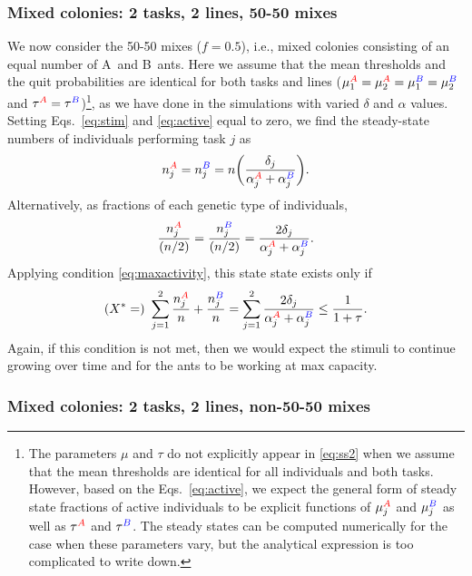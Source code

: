 \documentclass[11pt]{article}
\newcommand{\A}{{\color{red}A}}
\newcommand{\B}{{\color{blue}B}}
\begin{document}
\begin{appendices}
\subsubsection{Mixed colonies: 2 tasks, 2 lines, 50-50 mixes} \label{sec:5050}

We now consider the 50-50 mixes ($f=0.5$), i.e., mixed colonies consisting of an equal number of \A\ and \B\ ants.
Here we assume that the mean thresholds and the quit probabilities are identical for both tasks and lines ($\mu_1^{\A} = \mu_2^{\A} = \mu_1^{\B} = \mu_2^{\B}$ and $\tau^{\A} = \tau^{\B}$)\footnote{The parameters $\mu$ and $\tau$ do not explicitly appear in \eqref{eq:ss2} when we assume that the mean thresholds are identical for all individuals and both tasks. However, based on the Eqs.~\eqref{eq:active}, we expect the general form of steady state fractions of active individuals to be explicit functions of $\mu_j^{\A}$ and $\mu_j^{\B}$ as well as $\tau^{\A}$ and $\tau^{\B}$. The steady states can be computed numerically for the case when these parameters vary, but the analytical expression is too complicated to write down.}, as we have done in the simulations with varied $\delta$ and $\alpha$ values. Setting Eqs.~\eqref{eq:stim} and \eqref{eq:active} equal to zero, we find the steady-state numbers of individuals performing task $j$ as
\begin{equation}
     n_j^{\A} =  n_j^{\B} = n\bigg(\frac{\delta_j}{\alpha_j^{\A} + \alpha_j^{\B}}\bigg). \label{eq:ss2a}
\end{equation}
Alternatively, as fractions of each genetic type of individuals,
\begin{equation}
     \frac{n_j^{\A}}{(n/2)} =  \frac{n_j^{\B}}{(n/2)} = \frac{2\delta_j}{\alpha_j^{\A} + \alpha_j^{\B}}. \label{eq:ss2}
\end{equation}
Applying condition \eqref{eq:maxactivity}, this state state exists only if
\begin{equation}
     (X^*=)\ \sum_{j=1}^2 \frac{n_j^{\A}}{n} + \frac{n_j^{\B}}{n} 
     = \sum_{j=1}^2 \frac{2\delta_j}{\alpha_j^{\A} + \alpha_j^{\B}}
     \leq \frac{1}{1+\tau}.
     \label{eq:cond2}
\end{equation}
Again, if this condition is not met, then we would expect the stimuli to continue growing over time and for the ants to be working at max capacity.

\subsubsection{Mixed colonies: 2 tasks, 2 lines, non-50-50 mixes}


\end{appendices}
\end{document}
